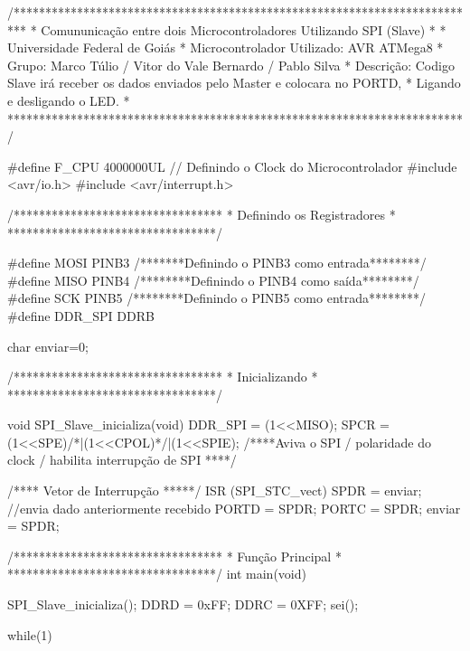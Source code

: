\begin{codigo}[caption = {SLAVE - Comunicação via SPI entre dois dispositivos}, label={codigo: Comunicação entre dispositivos AVR usando SPI - SLAVE },language=C, breaklines=true]

 
 /**************************************************************************
 *      Comununicação entre dois Microcontroladores Utilizando  SPI (Slave)
 *
 * Universidade Federal de Goiás
 * Microcontrolador Utilizado: AVR ATMega8
 * Grupo: Marco Túlio / Vitor do Vale Bernardo / Pablo Silva
 * Descrição: Codigo Slave irá receber os dados enviados pelo Master e colocara no PORTD,
 *            Ligando e desligando o LED.
 * 
 ************************************************************************/
    
   #define F_CPU 4000000UL  // Definindo o Clock do Microcontrolador
   #include <avr/io.h>
   #include <avr/interrupt.h>
   
   /*********************************
   *	Definindo os Registradores  *
   *********************************/
   
   #define MOSI     PINB3 /*******Definindo o PINB3 como entrada********/
   #define MISO     PINB4 /********Definindo o PINB4 como saída********/
   #define SCK      PINB5 /********Definindo o PINB5 como entrada********/
   #define DDR_SPI  DDRB
    
   char enviar=0;
    
   /*********************************
   *	Inicializando			    *
   *********************************/
   
   void SPI_Slave_inicializa(void)
   {
       DDR_SPI = (1<<MISO);
       SPCR = (1<<SPE)/*|(1<<CPOL)*/|(1<<SPIE); /****Aviva o SPI / polaridade do clock / habilita interrupção de SPI ****/
   }
   
   /**** Vetor de Interrupção *****/
   ISR (SPI_STC_vect)                         
   {
     SPDR = enviar; //envia dado anteriormente recebido
     PORTD = SPDR;
	 PORTC = SPDR;
     enviar = SPDR;
   }
   
   /*********************************
   *	Função Principal		    *
   *********************************/
   int main(void) 
   { 
       SPI_Slave_inicializa();
       DDRD = 0xFF;
       DDRC = 0XFF;
	   sei();
	   
	   while(1){
		   
	   }

   }

\end{codigo}


















